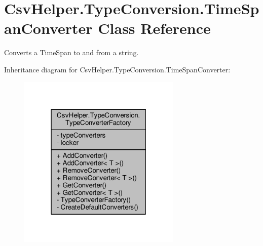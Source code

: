 \hypertarget{a00148}{\section{Csv\-Helper.\-Type\-Conversion.\-Time\-Span\-Converter Class Reference}
\label{a00148}
}


Converts a Time\-Span to and from a string.  




Inheritance diagram for Csv\-Helper.\-Type\-Conversion.\-Time\-Span\-Converter\-:
\nopagebreak
\begin{figure}[H]
\begin{center}
\leavevmode
\includegraphics[width=220pt]{d4/d1e/a00497}
\end{center}
\end{figure}


